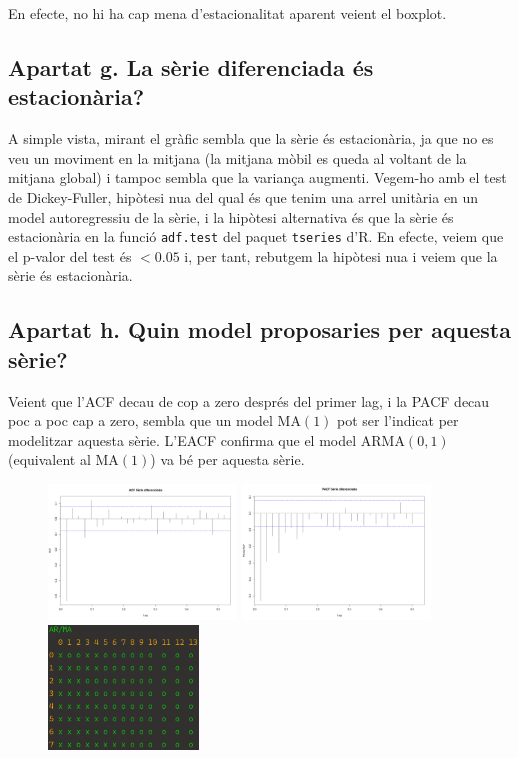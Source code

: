 \documentclass[a4paper, 11pt]{article}
\begin{document}
En efecte, no hi ha cap mena d'estacionalitat aparent veient el boxplot.

\subsection*{Apartat g. La sèrie diferenciada és estacionària?}

A simple vista, mirant el gràfic sembla que la sèrie és estacionària, ja que no es veu un moviment en la mitjana (la
mitjana mòbil es queda al voltant de la mitjana global) i tampoc sembla que la variança augmenti. Vegem-ho amb el test
de Dickey-Fuller, hipòtesi nu\lgem{}a del qual és que tenim una arrel unitària en un model autoregressiu de la sèrie, i
la hipòtesi alternativa és que la sèrie és estacionària en la funció \texttt{adf.test} del paquet \texttt{tseries} d'R.
En efecte, veiem que el p-valor del test és $< 0.05$ i, per tant, rebutgem la hipòtesi nu\lgem{}a i veiem que la sèrie
és estacionària.

\subsection*{Apartat h. Quin model proposaries per aquesta sèrie?}

Veient que l'ACF decau de cop a zero després del primer lag, i la PACF decau poc a poc cap a zero, sembla que un model
MA$(1)$ pot ser l'indicat per modelitzar aquesta sèrie. L'EACF confirma que el model ARMA$(0,1)$ (equivalent al
MA$(1)$) va bé per aquesta sèrie.

\begin{figure}[H]
  \centering
  \includegraphics[width=5cm]{assets/acf-diff.png}
  \includegraphics[width=5cm]{assets/pacf-diff.png}
  \includegraphics[width=4cm]{assets/eacf-diff.png}
\end{figure}
\end{document}
